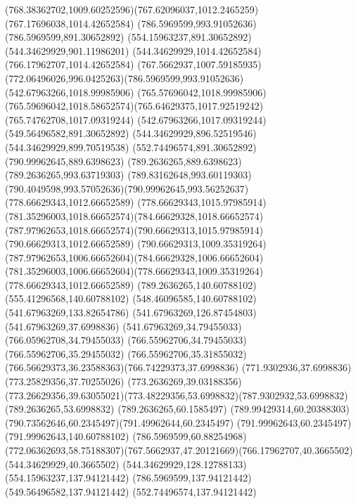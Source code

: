 {{	\curveto(768.38362702,1009.60252596)(767.62096037,1012.2465259)(767.17696038,1014.42652584)
	\closepath
	\moveto(786.5969599,993.91052636)
	\lineto(786.5969599,891.30652892)
	\lineto(554.15963237,891.30652892)
	\lineto(544.34629929,901.11986201)
	\lineto(544.34629929,1014.42652584)
	\lineto(766.17962707,1014.42652584)
	\curveto(767.5662937,1007.59185935)(772.06496026,996.0425263)(786.5969599,993.91052636)
	\moveto(542.67963266,1018.99985906)
	\lineto(765.57696042,1018.99985906)
	\curveto(765.59696042,1018.58652574)(765.64629375,1017.92519242)(765.74762708,1017.09319244)
	\lineto(542.67963266,1017.09319244)
	\closepath
	\moveto(549.56496582,891.30652892)
	\lineto(544.34629929,896.52519546)
	\lineto(544.34629929,899.70519538)
	\lineto(552.74496574,891.30652892)
	\closepath
	\moveto(790.99962645,889.6398623)
	\lineto(789.2636265,889.6398623)
	\lineto(789.2636265,993.63719303)
	\curveto(789.83162648,993.60119303)(790.4049598,993.57052636)(790.99962645,993.56252637)
	\closepath
	\moveto(778.66629343,1012.66652589)
	\curveto(778.66629343,1015.97985914)(781.35296003,1018.66652574)(784.66629328,1018.66652574)
	\curveto(787.97962653,1018.66652574)(790.66629313,1015.97985914)(790.66629313,1012.66652589)
	\curveto(790.66629313,1009.35319264)(787.97962653,1006.66652604)(784.66629328,1006.66652604)
	\curveto(781.35296003,1006.66652604)(778.66629343,1009.35319264)(778.66629343,1012.66652589)
	\moveto(789.2636265,140.60788102)
	\lineto(555.41296568,140.60788102)
	\lineto(548.46096585,140.60788102)
	\lineto(541.67963269,133.82654786)
	\lineto(541.67963269,126.87454803)
	\lineto(541.67963269,37.6998836)
	\lineto(541.67963269,34.79455033)
	\lineto(766.05962708,34.79455033)
	\lineto(766.55962706,34.79455033)
	\lineto(766.55962706,35.29455032)
	\curveto(766.55962706,35.31855032)(766.56629373,36.23588363)(766.74229373,37.6998836)
	\lineto(771.9302936,37.6998836)
	\lineto(773.25829356,37.70255026)
	\lineto(773.2636269,39.03188356)
	\curveto(773.26629356,39.63055021)(773.48229356,53.6998832)(787.9302932,53.6998832)
	\lineto(789.2636265,53.6998832)
	\lineto(789.2636265,60.1585497)
	\curveto(789.99429314,60.20388303)(790.73562646,60.2345497)(791.49962644,60.2345497)
	\lineto(791.99962643,60.2345497)
	\lineto(791.99962643,140.60788102)
	\closepath
	\moveto(786.5969599,60.88254968)
	\curveto(772.06362693,58.75188307)(767.5662937,47.20121669)(766.17962707,40.3665502)
	\lineto(544.34629929,40.3665502)
	\lineto(544.34629929,128.12788133)
	\lineto(554.15963237,137.94121442)
	\lineto(786.5969599,137.94121442)
	\closepath
	\moveto(549.56496582,137.94121442)
	\lineto(552.74496574,137.94121442)
}}
